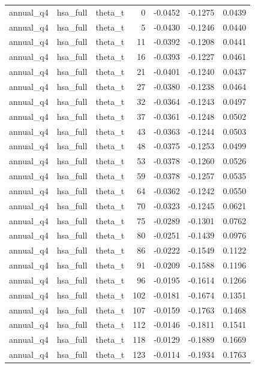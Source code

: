 \begin{tabular}{lllrrrr}
annual\_q4 & hsa\_full & theta\_t & 0 & -0.0452 & -0.1275 & 0.0439 \\
annual\_q4 & hsa\_full & theta\_t & 5 & -0.0430 & -0.1246 & 0.0440 \\
annual\_q4 & hsa\_full & theta\_t & 11 & -0.0392 & -0.1208 & 0.0441 \\
annual\_q4 & hsa\_full & theta\_t & 16 & -0.0393 & -0.1227 & 0.0461 \\
annual\_q4 & hsa\_full & theta\_t & 21 & -0.0401 & -0.1240 & 0.0437 \\
annual\_q4 & hsa\_full & theta\_t & 27 & -0.0380 & -0.1238 & 0.0464 \\
annual\_q4 & hsa\_full & theta\_t & 32 & -0.0364 & -0.1243 & 0.0497 \\
annual\_q4 & hsa\_full & theta\_t & 37 & -0.0361 & -0.1248 & 0.0502 \\
annual\_q4 & hsa\_full & theta\_t & 43 & -0.0363 & -0.1244 & 0.0503 \\
annual\_q4 & hsa\_full & theta\_t & 48 & -0.0375 & -0.1253 & 0.0499 \\
annual\_q4 & hsa\_full & theta\_t & 53 & -0.0378 & -0.1260 & 0.0526 \\
annual\_q4 & hsa\_full & theta\_t & 59 & -0.0378 & -0.1257 & 0.0535 \\
annual\_q4 & hsa\_full & theta\_t & 64 & -0.0362 & -0.1242 & 0.0550 \\
annual\_q4 & hsa\_full & theta\_t & 70 & -0.0323 & -0.1245 & 0.0621 \\
annual\_q4 & hsa\_full & theta\_t & 75 & -0.0289 & -0.1301 & 0.0762 \\
annual\_q4 & hsa\_full & theta\_t & 80 & -0.0251 & -0.1439 & 0.0976 \\
annual\_q4 & hsa\_full & theta\_t & 86 & -0.0222 & -0.1549 & 0.1122 \\
annual\_q4 & hsa\_full & theta\_t & 91 & -0.0209 & -0.1588 & 0.1196 \\
annual\_q4 & hsa\_full & theta\_t & 96 & -0.0195 & -0.1614 & 0.1266 \\
annual\_q4 & hsa\_full & theta\_t & 102 & -0.0181 & -0.1674 & 0.1351 \\
annual\_q4 & hsa\_full & theta\_t & 107 & -0.0159 & -0.1763 & 0.1468 \\
annual\_q4 & hsa\_full & theta\_t & 112 & -0.0146 & -0.1811 & 0.1541 \\
annual\_q4 & hsa\_full & theta\_t & 118 & -0.0129 & -0.1889 & 0.1669 \\
annual\_q4 & hsa\_full & theta\_t & 123 & -0.0114 & -0.1934 & 0.1763 \\

\end{tabular}
